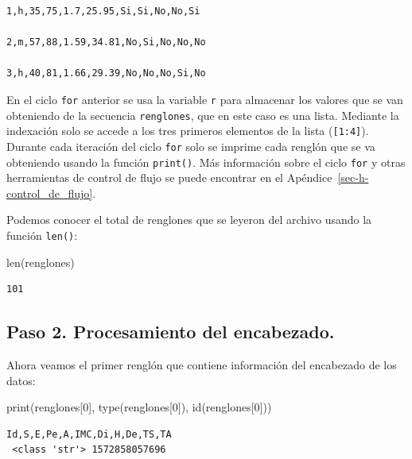 \documentclass[
  spanish,
  letterpaper,
]{scrbook}
\newenvironment{Shaded}{\begin{snugshade}}{\end{snugshade}}
\newcommand{\BuiltInTok}[1]{\textcolor[rgb]{0.00,0.23,0.31}{#1}}
\newcommand{\DecValTok}[1]{\textcolor[rgb]{0.68,0.00,0.00}{#1}}
\newcommand{\NormalTok}[1]{\textcolor[rgb]{0.00,0.23,0.31}{#1}}
\theoremstyle{definition}
\theoremstyle{remark}
\begin{document}
\begin{verbatim}
1,h,35,75,1.7,25.95,Si,Si,No,No,Si

2,m,57,88,1.59,34.81,No,Si,No,No,No

3,h,40,81,1.66,29.39,No,No,No,Si,No
\end{verbatim}

En el ciclo \texttt{for} anterior se usa la variable \texttt{r} para
almacenar los valores que se van obteniendo de la secuencia
\texttt{renglones}, que en este caso es una lista. Mediante la
indexación solo se accede a los tres primeros elementos de la lista
(\texttt{{[}1:4{]}}). Durante cada iteración del ciclo \texttt{for} solo
se imprime cada renglón que se va obteniendo usando la función
\texttt{print()}. Más información sobre el ciclo \texttt{for} y otras
herramientas de control de flujo se puede encontrar en el
Apéndice~\ref{sec-h-control_de_flujo}.

Podemos conocer el total de renglones que se leyeron del archivo usando
la función \texttt{len()}:

\begin{Shaded}
\begin{Highlighting}[]
\BuiltInTok{len}\NormalTok{(renglones)}
\end{Highlighting}
\end{Shaded}

\begin{verbatim}
101
\end{verbatim}

\subsection{Paso 2. Procesamiento del
encabezado.}\label{paso-2.-procesamiento-del-encabezado.}

Ahora veamos el primer renglón que contiene información del encabezado
de los datos:

\begin{Shaded}
\begin{Highlighting}[]
\BuiltInTok{print}\NormalTok{(renglones[}\DecValTok{0}\NormalTok{], }\BuiltInTok{type}\NormalTok{(renglones[}\DecValTok{0}\NormalTok{]), }\BuiltInTok{id}\NormalTok{(renglones[}\DecValTok{0}\NormalTok{]))}
\end{Highlighting}
\end{Shaded}

\begin{verbatim}
Id,S,E,Pe,A,IMC,Di,H,De,TS,TA
 <class 'str'> 1572858057696
\end{verbatim}
\end{document}
